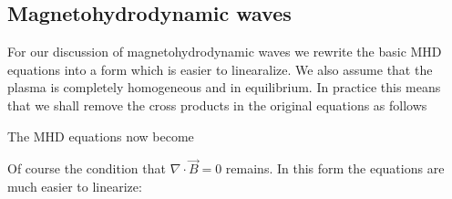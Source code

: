 \subsection{Magnetohydrodynamic waves}

For our discussion of magnetohydrodynamic waves we rewrite the basic MHD equations into a form which is easier to linearalize. We also assume that the plasma is completely homogeneous and in equilibrium. In practice this means that we shall remove the cross products in the original equations as follows 

{\centering 
{}
\par}


The MHD equations now become

{\centering 
\noindent {}
\par}

Of course the condition that $ \nabla \cdot \vec{B} = 0  $ remains. In this form the equations are much easier to linearize:

